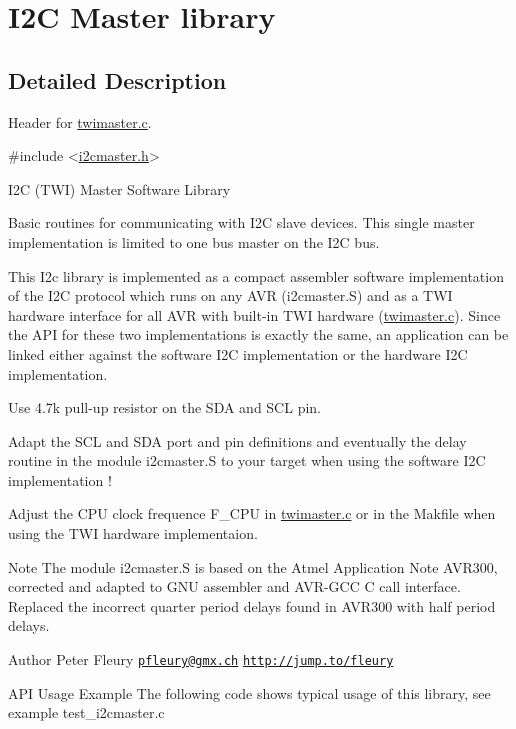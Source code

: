 \hypertarget{group__pfleury__ic2master}{\section{I2\-C Master library}
\label{group__pfleury__ic2master}
}


\subsection{Detailed Description}
Header for \hyperlink{twimaster_8c}{twimaster.\-c}. 
\begin{DoxyCode}
\textcolor{preprocessor}{#include <\hyperlink{i2cmaster_8h}{i2cmaster.h}>} 
\end{DoxyCode}


I2\-C (T\-W\-I) Master Software Library

Basic routines for communicating with I2\-C slave devices. This single master implementation is limited to one bus master on the I2\-C bus.

This I2c library is implemented as a compact assembler software implementation of the I2\-C protocol which runs on any A\-V\-R (i2cmaster.\-S) and as a T\-W\-I hardware interface for all A\-V\-R with built-\/in T\-W\-I hardware (\hyperlink{twimaster_8c}{twimaster.\-c}). Since the A\-P\-I for these two implementations is exactly the same, an application can be linked either against the software I2\-C implementation or the hardware I2\-C implementation.

Use 4.\-7k pull-\/up resistor on the S\-D\-A and S\-C\-L pin.

Adapt the S\-C\-L and S\-D\-A port and pin definitions and eventually the delay routine in the module i2cmaster.\-S to your target when using the software I2\-C implementation !

Adjust the C\-P\-U clock frequence F\-\_\-\-C\-P\-U in \hyperlink{twimaster_8c}{twimaster.\-c} or in the Makfile when using the T\-W\-I hardware implementaion.

\begin{DoxyNote}{Note}
The module i2cmaster.\-S is based on the Atmel Application Note A\-V\-R300, corrected and adapted to G\-N\-U assembler and A\-V\-R-\/\-G\-C\-C C call interface. Replaced the incorrect quarter period delays found in A\-V\-R300 with half period delays.
\end{DoxyNote}
\begin{DoxyAuthor}{Author}
Peter Fleury \href{mailto:pfleury@gmx.ch}{\tt pfleury@gmx.\-ch} \href{http://jump.to/fleury}{\tt http\-://jump.\-to/fleury}
\end{DoxyAuthor}
\begin{DoxyParagraph}{A\-P\-I Usage Example}
The following code shows typical usage of this library, see example test\-\_\-i2cmaster.\-c
\end{DoxyParagraph}

